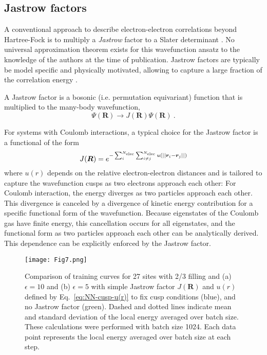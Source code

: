 \documentclass[
 reprint,
 amsmath,amssymb,
 aps, prx,
floatfix,longbibliography,
]{revtex4-2}
\begin{document}
\begin{appendix}
\section{Jastrow factors}
\label{app:Jastrow}

A conventional approach to describe electron-electron correlations beyond Hartree-Fock is to multiply a \emph{Jastrow} factor to a Slater determinant \cite{Jastrow1955Jun}. No universal approximation theorem exists for this wavefunction ansatz to the knowledge of the authors at the time of publication. Jastrow factors are typically be model specific and physically motivated, allowing to capture a large fraction of the correlation energy \cite{Foulkes2001Jan}.

A Jastrow factor is a bosonic (i.e. permutation equivariant) function that is multiplied to the many-body wavefunction, 
\begin{equation*}
    \Psi(\bm R) \to J(\bm R) \Psi(\bm R)\ .
\end{equation*}

For systems with Coulomb interactions, a typical choice for the Jastrow factor is a functional of the form
\begin{equation}
    J(\bm R) = e^{- \sum_{i }^{N_{\rm elec}}\sum_{i \neq j}^{N_{\rm elec}} u(||\bm r_i - \bm r_j||)}
    \label{eq:NN-attn-Jastrow-def}
\end{equation}
where $u(r)$ depends on the relative electron-electron distances and is tailored to capture the wavefunction cusps as two electrons approach each other: 
For Coulomb interaction, the energy diverges as two particles approach each other. This divergence is canceled by a divergence of kinetic energy contribution for a specific functional form of the wavefunction. Because eigenstates of the Coulomb gas have finite energy, this cancellation occurs for all eigenstates, and the functional form as two particles approach each other can be analytically derived. 
This dependence can be explicitly enforced by the Jastrow factor. 

\begin{figure}
    \centering
    \texttt{[image: Fig7.png]}
    \caption{Comparison of training curves for 27 sites with 2/3 filling and (a) $\epsilon = 10$ and (b) $\epsilon = 5$ with simple Jastrow factor $J(\bm R)$ and $u(r)$ defined by Eq.~\eqref{eq:NN-cusp-u(r)} to fix cusp conditions (blue), and no Jastrow factor (green). Dashed and dotted lines indicate mean and standard deviation of the local energy averaged over batch size. These calculations were performed with batch size 1024. Each data point represents the local energy averaged over batch size at each step.}
    \label{fig:SM-jastrow-comparison}
\end{figure}



\end{appendix}
\end{document}
